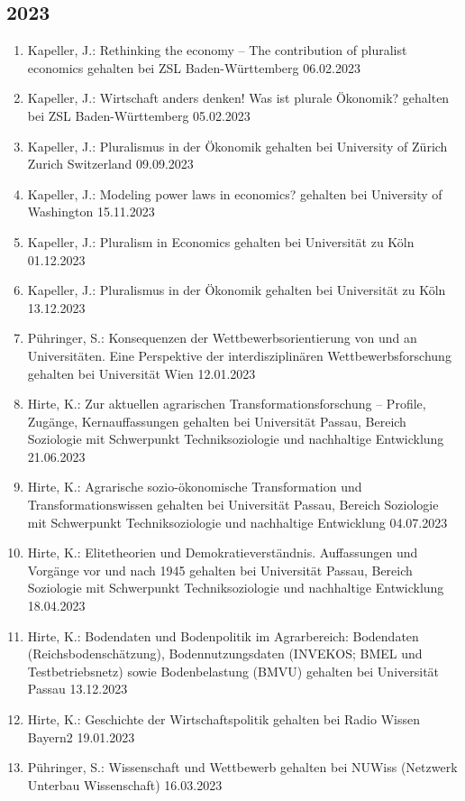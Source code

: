 \subsection*{2023}
\begin{enumerate}
	\item Kapeller, J.: Rethinking the economy – The contribution of pluralist economics gehalten bei ZSL Baden-Württemberg 06.02.2023
	\item Kapeller, J.: Wirtschaft anders denken! Was ist plurale Ökonomik? gehalten bei ZSL Baden-Württemberg 05.02.2023
	\item Kapeller, J.: Pluralismus in der Ökonomik gehalten bei University of Zürich Zurich Switzerland 09.09.2023
	\item Kapeller, J.: Modeling power laws in economics? gehalten bei University of Washington 15.11.2023
	\item Kapeller, J.: Pluralism in Economics gehalten bei Universität zu Köln 01.12.2023
	\item Kapeller, J.: Pluralismus in der Ökonomik gehalten bei Universität zu Köln 13.12.2023
	\item Pühringer, S.: Konsequenzen der Wettbewerbsorientierung von und an Universitäten. Eine Perspektive der interdisziplinären Wettbewerbsforschung gehalten bei Universität Wien 12.01.2023
	\item Hirte, K.: Zur aktuellen agrarischen Transformationsforschung – Profile, Zugänge, Kernauffassungen gehalten bei Universität Passau, Bereich Soziologie mit Schwerpunkt Techniksoziologie und nachhaltige Entwicklung 21.06.2023
	\item Hirte, K.: Agrarische sozio-ökonomische Transformation und Transformationswissen gehalten bei Universität Passau, Bereich Soziologie mit Schwerpunkt Techniksoziologie und nachhaltige Entwicklung 04.07.2023
	\item Hirte, K.: Elitetheorien und Demokratieverständnis. Auffassungen und Vorgänge vor und nach 1945 gehalten bei Universität Passau, Bereich Soziologie mit Schwerpunkt Techniksoziologie und nachhaltige Entwicklung 18.04.2023
	\item Hirte, K.: Bodendaten und Bodenpolitik im Agrarbereich: Bodendaten (Reichsbodenschätzung), Bodennutzungsdaten (INVEKOS; BMEL und Testbetriebsnetz) sowie Bodenbelastung (BMVU) gehalten bei Universität Passau 13.12.2023
	\item Hirte, K.: Geschichte der Wirtschaftspolitik gehalten bei Radio Wissen Bayern2 19.01.2023
	\item Pühringer, S.: Wissenschaft und Wettbewerb gehalten bei NUWiss (Netzwerk Unterbau Wissenschaft) 16.03.2023

\end{enumerate}
